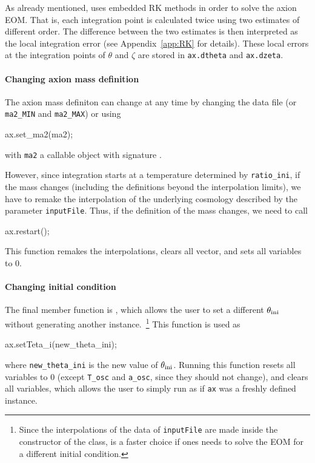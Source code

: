 \documentclass[11pt,a4paper]{article}
\begin{document}
As already mentioned, \mimes uses embedded RK methods in order to solve the axion EOM. That is, each integration point is calculated twice using two estimates of different order. The difference between the two estimates is then interpreted as the local integration error (see Appendix~\ref{app:RK} for details). These local errors at the integration points of $\theta$ and $\zeta$ are stored in {\tt ax.dtheta} and {\tt ax.dzeta}.


\paragraph{Changing axion mass definition}
%
The axion mass definiton can change at any time by changing the data file (or {\tt ma2\_MIN} and {\tt ma2\_MAX}) or using 
%
\begin{cpp}
	ax.set_ma2(ma2);
\end{cpp}
%
with {\tt ma2} a callable object with signature .

However, since integration starts at a temperature determined by {\tt ratio\_ini}, if the mass changes (including the definitions beyond the interpolation limits), we have to remake the interpolation of the underlying cosmology described by the parameter {\tt inputFile}. Thus, if the definition of the mass changes, we need to call 
%
\begin{cpp}
	ax.restart();
\end{cpp}
%
This function remakes the interpolations, clears all vector, and sets all variables to $0$. 


\paragraph{Changing initial condition}
%
The final member function is , which allows the user to set a different $\theta_{\rm ini}{}$ without generating another instance.~\footnote{Since the interpolations of the data of {\tt inputFile} are made inside the constructor of the  class,  is a faster choice if ones needs to solve the EOM for a different initial condition.} This function is used as    
%
\begin{cpp}
	ax.setTeta_i(new_theta_ini);
\end{cpp}
%
where {\tt new\_theta\_ini} is the new value of $\theta_{\rm ini}{}$. Running this function resets all variables to $0$ (except {\tt T\_osc} and {\tt a\_osc}, since they should not change), and clears all  variables, which allows the user to simply run  as if {\tt ax} was a freshly defined instance.  
\end{document}
